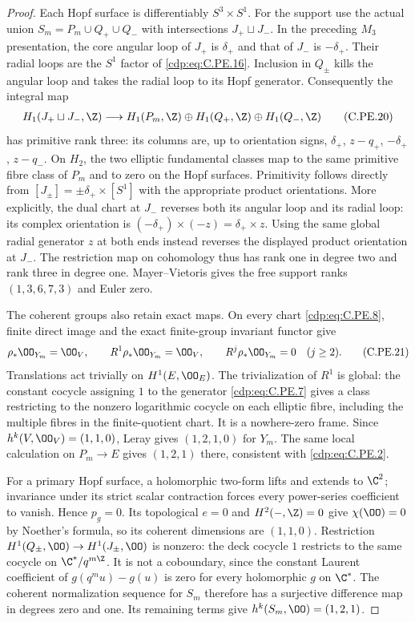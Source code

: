\begin{proof}
Each Hopf surface is differentiably $S^3\times S^1$.
For the support use the actual union
$S_m=P_m\cup Q_+\cup Q_-$ with intersections
$J_+\sqcup J_-$. In the preceding $M_3$ presentation,
the core angular loop of $J_+$ is $\delta_+$ and
that of $J_-$ is $-\delta_+$. Their radial loops
are the $S^1$ factor of \eqref{cdp:eq:C.PE.16}. Inclusion in
$Q_\pm$ kills the angular loop and takes the
radial loop to its Hopf generator. Consequently
the integral map
\[
 \begin{split}
 H_1(J_+\sqcup J_-,\Z)\longrightarrow
 H_1(P_m,\Z)\oplus H_1(Q_+,\Z)\oplus H_1(Q_-,\Z)
 \end{split}                                             \tag{C.PE.20}\label{cdp:eq:C.PE.20}
\]
has primitive rank three: its columns are, up to
orientation signs, $\delta_+$, $z-q_+$,
$-\delta_+$, $z-q_-$. On $H_2$, the two elliptic
fundamental classes map to the same primitive
fibre class of $P_m$ and to zero on the Hopf
surfaces. Primitivity follows directly from
$[J_\pm]=\pm\delta_+\times[S^1]$ with the appropriate
product orientations. More explicitly, the dual chart at
$J_-$ reverses both its angular loop and its radial loop:
its complex orientation is
$(-\delta_+)\times(-z)=\delta_+\times z$.
Using the same global radial generator $z$ at both
ends instead reverses the displayed product orientation
at $J_-$. The restriction map on
cohomology thus has rank one in degree two and
rank three in degree one. Mayer--Vietoris gives
the free support ranks $(1,3,6,7,3)$ and Euler zero.

The coherent groups also retain exact maps.
On every chart \eqref{cdp:eq:C.PE.8}, finite direct image and
the exact finite-group invariant functor give
\[
 \rho_*\OO_{Y_m}=\OO_V,\qquad
 R^1\rho_*\OO_{Y_m}=\OO_V,\qquad
 R^j\rho_*\OO_{Y_m}=0\quad(j\ge2).                       \tag{C.PE.21}\label{cdp:eq:C.PE.21}
\]
Translations act trivially on $H^1(E,\OO_E)$.
The trivialization of $R^1$ is global: the
constant cocycle assigning $1$ to the generator
\eqref{cdp:eq:C.PE.7} gives a class restricting to the
nonzero logarithmic cocycle on each elliptic
fibre, including the multiple fibres in the
finite-quotient chart. It is a nowhere-zero
frame. Since $h^k(V,\OO_V)=(1,1,0)$, Leray gives
$(1,2,1,0)$ for $Y_m$. The same local calculation
on $P_m\to E$ gives $(1,2,1)$ there, consistent
with \eqref{cdp:eq:C.PE.2}.

For a primary Hopf surface, a holomorphic
two-form lifts and extends to $\C^2$; invariance
under its strict scalar contraction forces
every power-series coefficient to vanish.
Hence $p_g=0$. Its topological $e=0$ and
$H^2(-,\Z)=0$ give $\chi(\OO)=0$ by Noether's
formula, so its coherent dimensions are
$(1,1,0)$. Restriction
$H^1(Q_\pm,\OO)\to H^1(J_\pm,\OO)$ is nonzero:
the deck cocycle $1$ restricts to the same
cocycle on $\C^*/q^{m\Z}$. It is not a
coboundary, since the constant Laurent
coefficient of $g(q^m u)-g(u)$ is zero for
every holomorphic $g$ on $\C^*$.
The coherent normalization sequence for
$S_m$ therefore has a surjective difference
map in degrees zero and one. Its remaining
terms give $h^k(S_m,\OO)=(1,2,1)$.


\end{proof}
